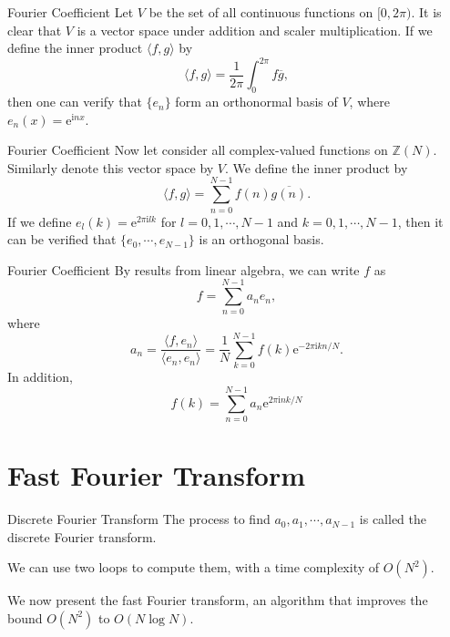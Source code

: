 \documentclass{beamer}
\begin{document}
\begin{frame}{Fourier Coefficient}
    Let $V$ be the set of all continuous functions on $[0, 2 \pi)$. It is clear that $V$ is a vector space under addition and scaler multiplication.
    \pause
    If we define the inner product $\langle f, g \rangle$ by
    $$
    \langle f, g \rangle = \frac{1}{2 \pi}\int_0^{2 \pi} f \overline g,
    $$
    then one can verify that $\{e_n\}$ form an orthonormal basis of $V$, where $e_n(x) = \text{e}^{\text{i}nx}$.
\end{frame}

\begin{frame}{Fourier Coefficient}
    Now let consider all complex-valued functions on $\mathbb Z(N)$. Similarly denote this vector space by $V$. We define the inner product by
    $$
    \langle f, g \rangle = \sum_{n = 0}^{N - 1} f(n) \overline{g(n)}.
    $$
    \pause
    If we define $e_l(k) = \text{e}^{2 \pi \text{i}lk}$ for $l = 0, 1, \cdots, N - 1$ and $k = 0, 1, \cdots, N - 1$, then it can be verified that 
    $\{e_0, \cdots, e_{N - 1}\}$ is an orthogonal basis.
\end{frame}

\begin{frame}{Fourier Coefficient}
    By results from linear algebra, we can write $f$ as
    $$
    f = \sum_{n = 0}^{N - 1} a_n e_n,
    $$
    where
    $$
    a_n = \frac{\langle f, e_n \rangle}{\langle e_n, e_n \rangle} = \frac{1}{N}\sum_{k = 0}^{N - 1} f(k) \text{e}^{- 2 \pi \text{i} kn / N}.
    $$
    \pause
    In addition,
    $$
    f(k) = \sum_{n = 0}^{N - 1} a_n \text{e}^{2 \pi \text{i} nk/N}
    $$
\end{frame}

\section{Fast Fourier Transform}

\begin{frame}{Discrete Fourier Transform}
    The process to find $a_0, a_1, \cdots, a_{N - 1}$ is called the discrete Fourier transform.

    \pause

    We can use two loops to compute them, with a time complexity of $O(N^2)$.

    \pause

    We now present the fast Fourier transform, an algorithm that improves the bound $O(N^2)$ to $O(N \log N)$.
\end{frame}
\end{document}

